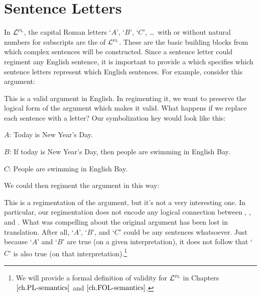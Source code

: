 \section{Sentence Letters}

In $\mathcal{L}^{\textsc{pl}}$, the capital Roman letters `$A$', `$B$', `$C$', \ldots\ with or without natural numbers for subscripts are the  of $\mathcal{L}^{\textsc{pl}}$.
These are the basic building blocks from which complex sentences will be constructed.
Since a sentence letter could regiment any English sentence, it is important to provide a  which specifies which sentence letters represent which English sentences.
For example, consider this argument:

\begin{earg} \label{newyear}
\end{earg}

This is a valid argument in English.
In regimenting it, we want to preserve the logical form of the argument which makes it valid.
What happens if we replace each sentence with a letter? 
Our symbolization key would look like this:

\begin{ekey}
  \item[$A$:] Today is New Year's Day.
  \item[$B$:] If today is New Year's Day, then people are swimming in English Bay.
  \item[$C$:] People are swimming in English Bay.
\end{ekey}

We could then regiment the argument in this way:

\begin{earg}
\end{earg}

This is a regimentation of the argument, but it's not a very interesting one.
In particular, our regimentation does not encode any logical connection between , , and .
What was compelling about the original argument has been lost in translation.
After all, `$A$', `$B$', and `$C$' could be any sentences whatsoever.
Just because `$A$' and `$B$' are true (on a given interpretation), it does not follow that `$C$' is also true (on that interpretation).\footnote{We will provide a formal definition of validity for $\mathcal{L}^{\textsc{pl}}$ in Chapters $\ref{ch.PL-semantics}$ and $\ref{ch.FOL-semantics}$.}


